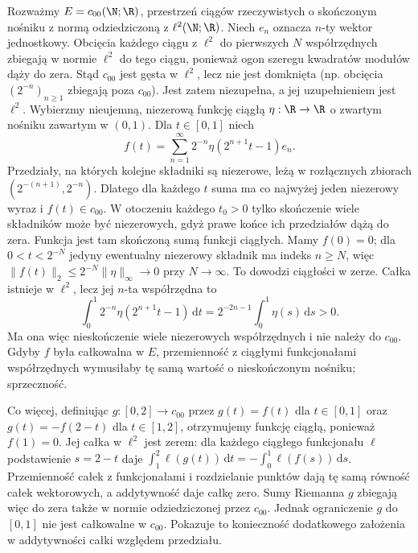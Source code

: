 \begin{przyklad}
\label{ex:noncomplete-integral15a}
Rozważmy $E=c_{00}(\N;\R)$, przestrzeń ciągów rzeczywistych
o skończonym nośniku z normą odziedziczoną z $\ell^2(\N;\R)$.
Niech $e_n$ oznacza $n$-ty wektor jednostkowy.
Obcięcia każdego ciągu z $\ell^2$ do pierwszych $N$ współrzędnych
zbiegają w normie $\ell^2$ do tego ciągu, ponieważ ogon
szeregu kwadratów modułów dąży do zera. Stąd $c_{00}$ jest
gęsta w $\ell^2$, lecz nie jest domknięta (np. obcięcia
$(2^{-n})_{n\ge1}$ zbiegają poza $c_{00}$).
Jest zatem niezupełna, a jej uzupełnieniem jest $\ell^2$.
Wybierzmy nieujemną, niezerową funkcję ciągłą $\eta:\R\to\R$
o zwartym nośniku zawartym w $(0,1)$.
Dla $t\in[0,1]$ niech
\[
 f(t)=\sum_{n=1}^{\infty}2^{-n}\eta(2^{n+1}t-1)e_n.
\]
Przedziały, na których kolejne składniki są niezerowe,
leżą w rozłącznych zbiorach $(2^{-(n+1)},2^{-n})$.
Dlatego dla każdego $t$ suma ma co najwyżej jeden niezerowy
wyraz i $f(t)\in c_{00}$. W otoczeniu każdego $t_0>0$ tylko skończenie wiele składników
może być niezerowych, gdyż prawe końce ich przedziałów dążą
do zera. Funkcja jest tam skończoną sumą funkcji ciągłych.
Mamy $f(0)=0$; dla $0<t<2^{-N}$ jedyny ewentualny
niezerowy składnik ma indeks $n\ge N$, więc
$\|f(t)\|_2\le2^{-N}\|\eta\|_\infty\to0$ przy $N\to\infty$.
To dowodzi ciągłości w zerze.
Całka istnieje w $\ell^2$, lecz jej $n$-ta współrzędna to
\[
 \int_0^1 2^{-n}\eta(2^{n+1}t-1)\,\mathrm dt
 =2^{-2n-1}\int_0^1\eta(s)\,\mathrm ds>0.
\]
Ma ona więc nieskończenie wiele niezerowych współrzędnych i nie
należy do $c_{00}$. Gdyby $f$ była całkowalna w $E$, przemienność
z ciągłymi funkcjonałami współrzędnych wymusiłaby tę samą
wartość o nieskończonym nośniku; sprzeczność.

Co więcej, definiując $g:[0,2]\to c_{00}$ przez $g(t)=f(t)$ dla
$t\in[0,1]$ oraz $g(t)=-f(2-t)$ dla $t\in[1,2]$, otrzymujemy
funkcję ciągłą, ponieważ $f(1)=0$. Jej całka w $\ell^2$ jest zerem: dla każdego ciągłego
funkcjonału $\ell$ podstawienie $s=2-t$ daje
$\int_1^2\ell(g(t))\,\mathrm dt=-\int_0^1\ell(f(s))\,\mathrm ds$.
Przemienność całek z funkcjonałami i rozdzielanie punktów
dają tę samą równość całek wektorowych, a addytywność
daje całkę zero. Sumy Riemanna $g$ zbiegają
więc do zera także w normie odziedziczonej przez $c_{00}$.
Jednak ograniczenie $g$ do $[0,1]$ nie jest całkowalne w $c_{00}$.
Pokazuje to konieczność dodatkowego założenia w addytywności całki
względem przedziału.
\end{przyklad}

